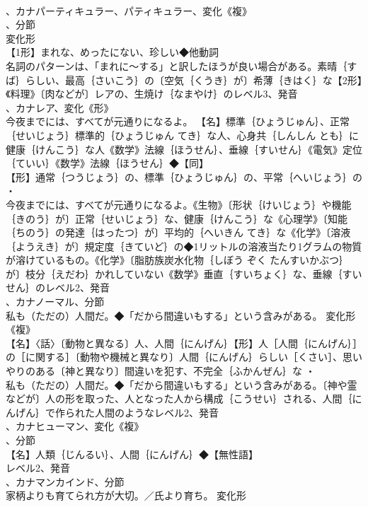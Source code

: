 \documentclass[8pt]{extreport}
\begin{document}
\begin{CJK}{UTF8}{min}
\\	、カナパーティキュラー、パティキュラー、変化《複》
\\	、分節
\\	変化形 
\\	【1形】まれな、めったにない、珍しい◆他動詞 
\\	名詞のパターンは、「まれに～する」と訳したほうが良い場合がある。素晴｛すば｝らしい、最高｛さいこう｝の〔空気｛くうき｝が〕希薄｛きはく｝な【2形】《料理》〔肉などが〕レアの、生焼け｛なまやけ｝のレベル3、発音
\\	、カナレア、変化《形》
\\	今夜までには、すべてが元通りになるよ。		【名】標準｛ひょうじゅん｝、正常｛せいじょう｝標準的｛ひょうじゅん てき｝な人、心身共｛しんしん とも｝に健康｛けんこう｝な人《数学》法線｛ほうせん｝、垂線｛すいせん｝《電気》定位｛ていい｝《数学》法線｛ほうせん｝◆【同】
\\	【形】通常｛つうじょう｝の、標準｛ひょうじゅん｝の、平常｛へいじょう｝の ・
\\	今夜までには、すべてが元通りになるよ。《生物》〔形状｛けいじょう｝や機能｛きのう｝が〕正常｛せいじょう｝な、健康｛けんこう｝な《心理学》〔知能｛ちのう｝の発達｛はったつ｝が〕平均的｛へいきん てき｝な《化学》〔溶液｛ようえき｝が〕規定度｛きていど｝の◆1リットルの溶液当たり1グラムの物質が溶けているもの。《化学》〔脂肪族炭水化物｛しぼう ぞく たんすいかぶつ｝が〕枝分｛えだわ｝かれしていない《数学》垂直｛すいちょく｝な、垂線｛すいせん｝のレベル2、発音
\\	、カナノーマル、分節
\\	私も（ただの）人間だ。◆「だから間違いもする」という含みがある。	変化形 
\\	《複》
\\	【名】〈話〉〔動物と異なる〕人、人間｛にんげん｝【形】人［人間｛にんげん｝］の［に関する］〔動物や機械と異なり〕人間｛にんげん｝らしい［くさい］、思いやりのある〔神と異なり〕間違いを犯す、不完全｛ふかんぜん｝な ・
\\	私も（ただの）人間だ。◆「だから間違いもする」という含みがある。〔神や霊などが〕人の形を取った、人となった人から構成｛こうせい｝される、人間｛にんげん｝で作られた人間のようなレベル2、発音
\\	、カナヒューマン、変化《複》
\\	、分節
\\	【名】人類｛じんるい｝、人間｛にんげん｝◆【無性語】
\\	レベル2、発音
\\	、カナマンカインド、分節
\\	家柄よりも育てられ方が大切。／氏より育ち。	変化形 

\end{CJK}
\end{document}
